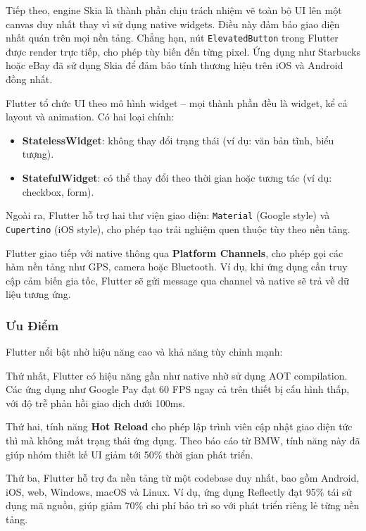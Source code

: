 Tiếp theo, engine Skia là thành phần chịu trách nhiệm vẽ toàn bộ UI lên một canvas duy nhất thay vì sử dụng native widgets.  
Điều này đảm bảo giao diện nhất quán trên mọi nền tảng.  
Chẳng hạn, nút \texttt{ElevatedButton} trong Flutter được render trực tiếp, cho phép tùy biến đến từng pixel.  
Ứng dụng như Starbucks hoặc eBay đã sử dụng Skia để đảm bảo tính thương hiệu trên iOS và Android đồng nhất.

Flutter tổ chức UI theo mô hình widget – mọi thành phần đều là widget, kể cả layout và animation.  
Có hai loại chính:
\begin{itemize}
    \item \textbf{StatelessWidget}: không thay đổi trạng thái (ví dụ: văn bản tĩnh, biểu tượng).
    \item \textbf{StatefulWidget}: có thể thay đổi theo thời gian hoặc tương tác (ví dụ: checkbox, form).
\end{itemize}

Ngoài ra, Flutter hỗ trợ hai thư viện giao diện: \texttt{Material} (Google style) và \texttt{Cupertino} (iOS style), cho phép tạo trải nghiệm quen thuộc tùy theo nền tảng.

Flutter giao tiếp với native thông qua \textbf{Platform Channels}, cho phép gọi các hàm nền tảng như GPS, camera hoặc Bluetooth.  
Ví dụ, khi ứng dụng cần truy cập cảm biến gia tốc, Flutter sẽ gửi message qua channel và native sẽ trả về dữ liệu tương ứng.

\subsubsection{Ưu Điểm}

Flutter nổi bật nhờ hiệu năng cao và khả năng tùy chỉnh mạnh:

Thứ nhất, Flutter có hiệu năng gần như native nhờ sử dụng AOT compilation.  
Các ứng dụng như Google Pay đạt 60 FPS ngay cả trên thiết bị cấu hình thấp, với độ trễ phản hồi giao dịch dưới 100ms.

Thứ hai, tính năng \textbf{Hot Reload} cho phép lập trình viên cập nhật giao diện tức thì mà không mất trạng thái ứng dụng.  
Theo báo cáo từ BMW, tính năng này đã giúp nhóm thiết kế UI giảm tới 50\% thời gian phát triển.

Thứ ba, Flutter hỗ trợ đa nền tảng từ một codebase duy nhất, bao gồm Android, iOS, web, Windows, macOS và Linux.  
Ví dụ, ứng dụng Reflectly đạt 95\% tái sử dụng mã nguồn, giúp giảm 70\% chi phí bảo trì so với phát triển riêng lẻ từng nền tảng.

